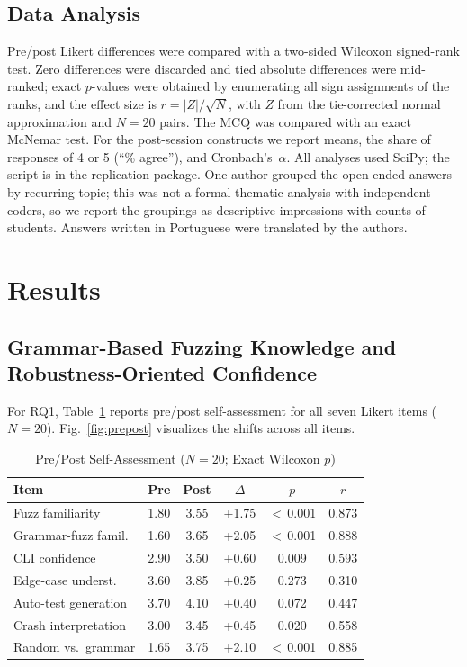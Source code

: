 \documentclass[conference]{IEEEtran}
\begin{document}
\subsection{Data Analysis}

Pre/post Likert differences were compared with a two-sided Wilcoxon signed-rank test.
Zero differences were discarded and tied absolute differences were mid-ranked; exact $p$-values were obtained by enumerating all sign assignments of the ranks, and the effect size is $r = |Z|/\sqrt{N}$, with $Z$ from the tie-corrected normal approximation and $N = 20$ pairs.
The MCQ was compared with an exact McNemar test.
For the post-session constructs we report means, the share of responses of 4 or 5 (``\% agree''), and Cronbach's~$\alpha$.
All analyses used SciPy; the script is in the replication package.
One author grouped the open-ended answers by recurring topic; this was not a formal thematic analysis with independent coders, so we report the groupings as descriptive impressions with counts of students.
Answers written in Portuguese were translated by the authors.

\section{Results}
\label{sec:results}

\subsection{Grammar-Based Fuzzing Knowledge and Robustness-Oriented Confidence}

For RQ1, Table~\ref{tab:likert} reports pre/post self-assessment for all seven Likert items ($N = 20$).
Fig.~\ref{fig:prepost} visualizes the shifts across all items.

\begin{table}[htbp]
\caption{Pre/Post Self-Assessment ($N = 20$; Exact Wilcoxon $p$)}
\label{tab:likert}
\centering
\small
\setlength{\tabcolsep}{4pt}
\begin{tabular}{lccccc}
\toprule
Item & Pre & Post & $\Delta$ & $p$ & $r$ \\
\midrule
Fuzz familiarity         & 1.80 & 3.55 & +1.75 & $<$\,0.001 & 0.873 \\
Grammar-fuzz famil.      & 1.60 & 3.65 & +2.05 & $<$\,0.001 & 0.888 \\
CLI confidence           & 2.90 & 3.50 & +0.60 & 0.009 & 0.593 \\
Edge-case underst.       & 3.60 & 3.85 & +0.25 & 0.273 & 0.310 \\
Auto-test generation     & 3.70 & 4.10 & +0.40 & 0.072 & 0.447 \\
Crash interpretation     & 3.00 & 3.45 & +0.45 & 0.020 & 0.558 \\
Random vs.\ grammar      & 1.65 & 3.75 & +2.10 & $<$\,0.001 & 0.885 \\
\bottomrule
\end{tabular}
\end{table}
\end{document}

